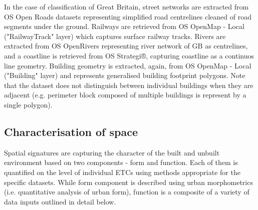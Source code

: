 
In the case of classification of Great Britain, street networks are extracted from OS
Open Roads datasets\cite{openroads2020} representing simplified road centrelines cleaned of road
segments under the ground. Railways are retrieved from OS OpenMap - Local\cite{openmap2020}
("RailwayTrack" layer) which captures surface railway tracks. Rivers are extracted from
OS OpenRivers\cite{openrivers2020} representing river network of GB as centrelines, and a coastline is
retrieved from OS Strategi®\cite{strategi2016}, capturing  coastline as a continuos line
geometry. Building geometry is extracted, again, from OS OpenMap - Local ("Building"
layer) and represents generalised building footprint polygons. Note that the dataset
does not distinguish between individual buildings when they are adjacent (e.g. perimeter
block composed of multiple buildings is represent by a single polygon).

\subsection*{Characterisation of space}
Spatial signatures are capturing the character of the built and unbuilt environment
based on two components - form and function. Each of them is quantified on the level of
individual ETCs using methods appropriate for the specific datasets. While form
component is described using urban morphometrics (i.e. quantitative analysis of urban
form), function is a composite of a variety of data inputs outlined in detail below.

